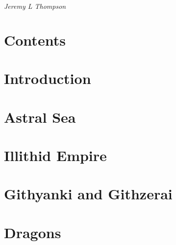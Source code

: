 \documentclass[twoside, openany]{book}
\begin{document}
\begin{titlepage}
\centering

~\\
\vspace{5cm}
\\
\vspace{2cm}
{\Large\itshape Jeremy L Thompson}

\end{titlepage}
\thispagestyle{empty}

\chapter*{Contents}

\begin{multicols}{2}
\makeatletter
\large{
}
\makeatother
\end{multicols}

\chapter*{Introduction}



\chapter{Astral Sea}



\chapter{Illithid Empire}



\chapter{Githyanki and Githzerai}



\chapter{Dragons}


\end{document}
